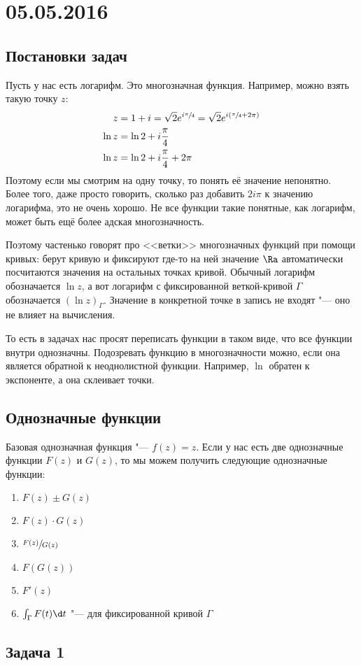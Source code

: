 \chapter{05.05.2016}

\section{Постановки задач}
	\TODO
	Пусть у нас есть логарифм.
	Это многозначная функция.
	Например, можно взять такую точку $z$:
	\begin{align*}
		z &= 1 + i = \sqrt 2 e^{i\sfrac{\pi}4} = \sqrt 2 e^{i(\sfrac{\pi}4+2\pi)} \\
		\ln z &= \ln 2 + i\frac{\pi}4 \\
		\ln z &= \ln 2 + i\frac{\pi}4 + 2\pi \\
	\end{align*}
	Поэтому если мы смотрим на одну точку, то понять её значение непонятно.
	Более того, даже просто говорить, сколько раз добавить $2i\pi$ к значению логарифма, это не очень хорошо.
	Не все функции такие понятные, как логарифм, может быть ещё более адская многозначность.

	Поэтому частенько говорят про <<ветки>> многозначных функций при помощи кривых: берут кривую
	и фиксируют где-то на ней значение $\Ra$ автоматически посчитаются значения на остальных точках кривой.
	Обычный логарифм обозначается $\ln z$, а вот логарифм с фиксированной веткой-кривой $\Gamma$
	обозначается $(\ln z)_{\Gamma}$.
	Значение в конкретной точке в запись не входят "--- оно не влияет на вычисления.

	То есть в задачах нас просят переписать функции в таком виде, что все функции внутри однозначны.
	Подозревать функцию в многозначности можно, если она является обратной к неоднолистной функции.
	Например, $\ln$ обратен к экспоненте, а она склеивает точки.

\section{Однозначные функции}
	Базовая однозначная функция "--- $f(z)=z$.
	Если у нас есть две однозначные функции $F(z)$ и $G(z)$, то мы можем получить следующие однозначные функции:
	\begin{enumerate}
		\item $F(z) \pm G(z)$
		\item $F(z) \cdot G(z)$
		\item $\sfrac{F(z)}{G(z)}$
		\item $F(G(z))$
		\item $F'(z)$
		\item $\int_{\Gamma} F(t) \d t$ "--- для фиксированной кривой $\Gamma$
	\end{enumerate}

\section{Задача 1}
	